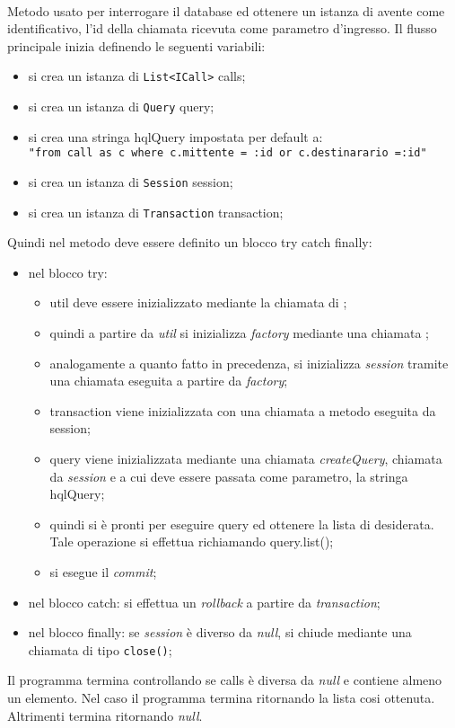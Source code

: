 \begin{description}
	\item{}\\
	Metodo usato per interrogare il database ed ottenere un istanza di  avente come identificativo, l'id della chiamata ricevuta come parametro d'ingresso. Il flusso principale inizia definendo le seguenti variabili:
	\begin{itemize}
		\item si crea un istanza di \texttt{List<ICall>} calls;
		\item si crea un istanza di \texttt{Query} query;
		\item si crea una stringa hqlQuery impostata per default a:\\
			\verb|"from call as c where c.mittente = :id or c.destinarario =:id"|
		\item si crea un istanza di \texttt{Session} session;
		\item si crea un istanza di \texttt{Transaction} transaction;
	\end{itemize}
	Quindi nel metodo deve essere definito un blocco try catch finally:
	\begin{itemize}
		\item nel blocco try:
		\begin{itemize}
			\item util deve essere inizializzato mediante la chiamata  di ;
			\item quindi a partire da \textit{util} si inizializza \textit{factory} mediante una chiamata ;
			\item analogamente a quanto fatto in precedenza, si inizializza \textit{session} tramite una chiamata  eseguita a partire da \textit{factory};
			\item transaction viene inizializzata con una chiamata a metodo  eseguita da session;
			\item query viene inizializzata mediante una chiamata \textit{createQuery}, chiamata da \textit{session} e a cui deve essere passata come parametro, la stringa hqlQuery;
			\item quindi si è pronti per eseguire query ed ottenere la lista di  desiderata. Tale operazione si effettua richiamando query.list();
			\item si esegue il \textit{commit};
		\end{itemize}
		\item nel blocco catch: si effettua un \textit{rollback} a partire da \textit{transaction};
		\item nel blocco finally: se \textit{session} è diverso da \textit{null}, si chiude mediante una chiamata di tipo \texttt{close()};
	\end{itemize}
	Il programma termina controllando se calls è diversa da \textit{null} e contiene almeno un elemento. Nel caso il programma termina ritornando la lista cosi ottenuta. Altrimenti termina ritornando \textit{null}.
	
\end{description}

